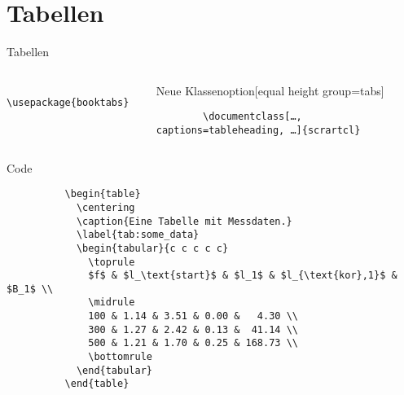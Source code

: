 \section{Tabellen}

\begin{frame}[fragile]{
  Tabellen
  \hfill
}
  \begin{columns}[t, onlytextwidth]
    \begin{column}{0.30\textwidth}
      \begin{Packages}[equal height group=tabs]
        \begin{lstlisting}
          \usepackage{booktabs}
        \end{lstlisting}
      \end{Packages}
    \end{column}
    \begin{column}{0.68\textwidth}
    \begin{block}{Neue Klassenoption}[equal height group=tabs]
      \begin{lstlisting}
        \documentclass[…, captions=tableheading, …]{scrartcl}
      \end{lstlisting}
    \end{block}
    \end{column}
  \end{columns}
  \vspace{-2pt}
  \begin{columns}[onlytextwidth, t]
    \begin{column}{0.60\textwidth}
      \fontsize{8}{6}
      \begin{block}{Code}
        \begin{lstlisting}
          \begin{table}
            \centering
            \caption{Eine Tabelle mit Messdaten.}
            \label{tab:some_data}
            \begin{tabular}{c c c c c}
              \toprule
              $f$ & $l_\text{start}$ & $l_1$ & $l_{\text{kor},1}$ & $B_1$ \\
              \midrule
              100 & 1.14 & 3.51 & 0.00 &   4.30 \\
              300 & 1.27 & 2.42 & 0.13 &  41.14 \\
              500 & 1.21 & 1.70 & 0.25 & 168.73 \\
              \bottomrule
            \end{tabular}
          \end{table}

\end{lstlisting}
\end{block}
\end{column}
\end{columns}
\end{frame}

